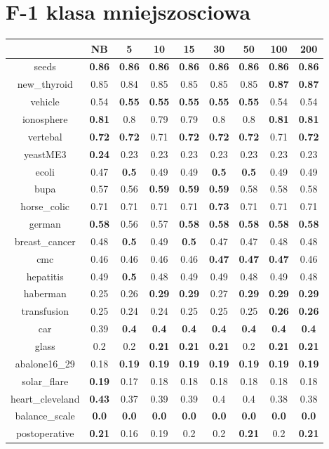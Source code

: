 \documentclass{article}%
\begin{document}
%
\section*{F{-}1 klasa mniejszosciowa}%
\begin{tabular}{c|cccccccc}%
\hline%
&NB&5&10&15&30&50&100&200\\%
\hline%
seeds&\textbf{0.86}&\textbf{0.86}&\textbf{0.86}&\textbf{0.86}&\textbf{0.86}&\textbf{0.86}&\textbf{0.86}&\textbf{0.86}\\%
new\_thyroid&0.85&0.84&0.85&0.85&0.85&0.85&\textbf{0.87}&\textbf{0.87}\\%
vehicle&0.54&\textbf{0.55}&\textbf{0.55}&\textbf{0.55}&\textbf{0.55}&\textbf{0.55}&0.54&0.54\\%
ionosphere&\textbf{0.81}&0.8&0.79&0.79&0.8&0.8&\textbf{0.81}&\textbf{0.81}\\%
vertebal&\textbf{0.72}&\textbf{0.72}&0.71&\textbf{0.72}&\textbf{0.72}&\textbf{0.72}&0.71&\textbf{0.72}\\%
yeastME3&\textbf{0.24}&0.23&0.23&0.23&0.23&0.23&0.23&0.23\\%
ecoli&0.47&\textbf{0.5}&0.49&0.49&\textbf{0.5}&\textbf{0.5}&0.49&0.49\\%
bupa&0.57&0.56&\textbf{0.59}&\textbf{0.59}&\textbf{0.59}&0.58&0.58&0.58\\%
horse\_colic&0.71&0.71&0.71&0.71&\textbf{0.73}&0.71&0.71&0.71\\%
german&\textbf{0.58}&0.56&0.57&\textbf{0.58}&\textbf{0.58}&\textbf{0.58}&\textbf{0.58}&\textbf{0.58}\\%
breast\_cancer&0.48&\textbf{0.5}&0.49&\textbf{0.5}&0.47&0.47&0.48&0.48\\%
cmc&0.46&0.46&0.46&0.46&\textbf{0.47}&\textbf{0.47}&\textbf{0.47}&0.46\\%
hepatitis&0.49&\textbf{0.5}&0.48&0.49&0.49&0.48&0.49&0.48\\%
haberman&0.25&0.26&\textbf{0.29}&\textbf{0.29}&0.27&\textbf{0.29}&\textbf{0.29}&\textbf{0.29}\\%
transfusion&0.25&0.24&0.24&0.25&0.25&0.25&\textbf{0.26}&\textbf{0.26}\\%
car&0.39&\textbf{0.4}&\textbf{0.4}&\textbf{0.4}&\textbf{0.4}&\textbf{0.4}&\textbf{0.4}&\textbf{0.4}\\%
glass&0.2&0.2&\textbf{0.21}&\textbf{0.21}&\textbf{0.21}&0.2&\textbf{0.21}&\textbf{0.21}\\%
abalone16\_29&0.18&\textbf{0.19}&\textbf{0.19}&\textbf{0.19}&\textbf{0.19}&\textbf{0.19}&\textbf{0.19}&\textbf{0.19}\\%
solar\_flare&\textbf{0.19}&0.17&0.18&0.18&0.18&0.18&0.18&0.18\\%
heart\_cleveland&\textbf{0.43}&0.37&0.39&0.39&0.4&0.4&0.38&0.38\\%
balance\_scale&\textbf{0.0}&\textbf{0.0}&\textbf{0.0}&\textbf{0.0}&\textbf{0.0}&\textbf{0.0}&\textbf{0.0}&\textbf{0.0}\\%
postoperative&\textbf{0.21}&0.16&0.19&0.2&0.2&\textbf{0.21}&0.2&\textbf{0.21}\\%
\end{tabular}
\end{document}
